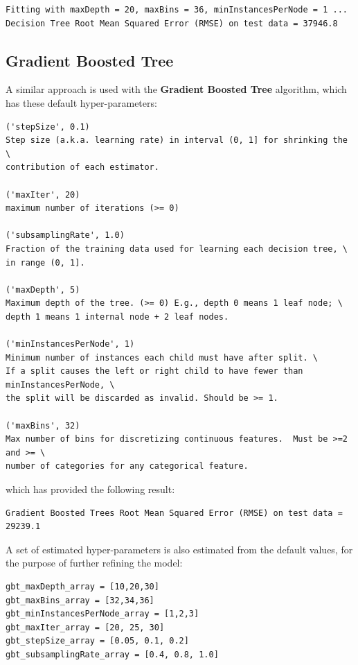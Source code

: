 \documentclass[11pt,a4paper,titlepage]{article}
\begin{document}
\begin{verbatim}
Fitting with maxDepth = 20, maxBins = 36, minInstancesPerNode = 1 ...
Decision Tree Root Mean Squared Error (RMSE) on test data = 37946.8
\end{verbatim}

\subsection{Gradient Boosted Tree}

A similar approach is used with the \textbf{Gradient Boosted Tree} algorithm, which has these default hyper-parameters:

\begin{verbatim}
('stepSize', 0.1)
Step size (a.k.a. learning rate) in interval (0, 1] for shrinking the \
contribution of each estimator.

('maxIter', 20)
maximum number of iterations (>= 0)

('subsamplingRate', 1.0)
Fraction of the training data used for learning each decision tree, \
in range (0, 1].

('maxDepth', 5)
Maximum depth of the tree. (>= 0) E.g., depth 0 means 1 leaf node; \
depth 1 means 1 internal node + 2 leaf nodes.

('minInstancesPerNode', 1)
Minimum number of instances each child must have after split. \
If a split causes the left or right child to have fewer than minInstancesPerNode, \
the split will be discarded as invalid. Should be >= 1.

('maxBins', 32)
Max number of bins for discretizing continuous features.  Must be >=2 and >= \
number of categories for any categorical feature.
\end{verbatim}

which has provided the following result:

\begin{verbatim}
Gradient Boosted Trees Root Mean Squared Error (RMSE) on test data = 29239.1
\end{verbatim}

A set of estimated hyper-parameters is also estimated from the default values, for the purpose of further refining the model:

\begin{verbatim}
gbt_maxDepth_array = [10,20,30]
gbt_maxBins_array = [32,34,36]
gbt_minInstancesPerNode_array = [1,2,3]
gbt_maxIter_array = [20, 25, 30]
gbt_stepSize_array = [0.05, 0.1, 0.2]
gbt_subsamplingRate_array = [0.4, 0.8, 1.0]
\end{verbatim}
\end{document}
